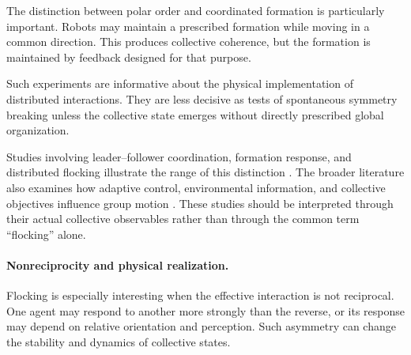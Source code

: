 The distinction between polar order and
coordinated formation is particularly
important. Robots may maintain a prescribed
formation while moving in a common direction.
This produces collective coherence, but
the formation is maintained by feedback
designed for that purpose.

Such experiments are informative about
the physical implementation of
distributed interactions. They are
less decisive as tests of spontaneous
symmetry breaking unless the collective
state emerges without directly prescribed
global organization.

Studies involving leader--follower
coordination, formation response,
and distributed flocking illustrate
the range of this distinction
\cite{Lei2006asequencableflocki,La2011decentralizedflocki,Min2011designandanalysis,Wang2012flockingbaseddistr,Jia2014experimentalimpleme,Mao2014flockingofmultiro,Lee2014distributedcohesive,Savkin2015distributedformatio,Jia2015leaderfollowerfloc,Sakai2016flockingformultiro,Shirazi2017astrategyforself,Khaledyan2019flockingandtarget,Zheng2020experimentalimpleme,Ibuki2020optimizationbasedd,Zheng2021optimizingparameter,Zhang2022collectivefissionb,MendozaRobles2026distributedformatio}.
The broader literature also examines how
adaptive control, environmental information,
and collective objectives influence
group motion
\cite{Fine2012examiningtheinform,elikkanat2010steeringselforgani,Toshiyuki2016adaptiveroleassign,Yasuda2018generatingandanaly,OrdazRivas2018collectivetasksfor,Horyna2022decentralizedswarms,nr2022mindthegappredic,nr2024predictivesearchmo,CetinaDenis2025flockingcontrolfor,Bahaidarah2024swarmflockingusing,Soria2021predictivecontrolo,Huang2024atiassembletopolo,Petrek2020bioinspiredcompact,Novk2021fastcollectiveevas,Ahmad2022pacnavacollective,Balzs2020adaptiveleadership,Liu2020computationalandro}.
These studies should be interpreted through
their actual collective observables rather
than through the common term ``flocking''
alone.

\paragraph*{Nonreciprocity and physical realization.}

Flocking is especially interesting when
the effective interaction is not reciprocal.
One agent may respond to another more
strongly than the reverse, or its response
may depend on relative orientation and
perception. Such asymmetry can change
the stability and dynamics of collective
states.

